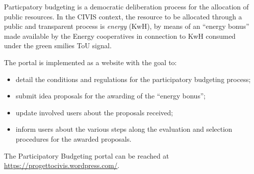 Particpatory budgeting is a democratic deliberation process for the allocation of public resources. 
In the CIVIS context, the resource to be allocated through a public and transparent process is \emph{energy} (KwH), by means of an ``energy bonus''
made available by the Energy cooperatives in connection to
KwH consumed under the green smilies ToU signal.

The portal is implemented as a website with the goal to:
\begin{itemize}
 \item detail the conditions and regulations for the participatory budgeting process;
 \item submit idea proposals for the awarding of the ``energy bonus'';
 \item update involved users about the proposals received;
 \item inform users about the various steps along the evaluation and selection procedures for the awarded proposals. 
\end{itemize}
The Participatory Budgeting portal can be reached at \url{https://progettocivis.wordpress.com/}.

%
